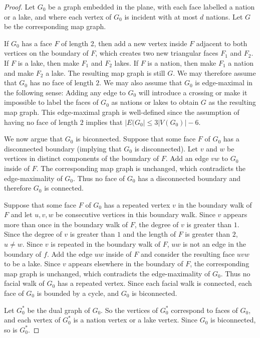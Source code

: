 \documentclass{patmorin}
\theoremstyle{plain}
\theoremstyle{definition}
\renewcommand{\leq}{\leqslant}
\begin{document}
\begin{proof}
Let $G_0$ be a graph embedded in the plane, with each face labelled a nation or a lake, and where each vertex of $G_0$ is incident with at most $d$ nations. Let $G$ be the corresponding map graph.

If $G_0$ has a face $F$ of length 2, then add a new vertex inside $F$ adjacent to both vertices on the boundary of $F$, which creates two new triangular faces $F_1$ and $F_2$. If $F$ is a lake, then make $F_1$ and $F_2$ lakes. If $F$ is a nation, then make $F_1$ a nation and make $F_2$ a lake. The resulting map graph is still $G$. We may therefore assume that $G_0$ has no face of length $2$.  We may also assume that $G_0$ is edge-maximal in the following sense: Adding any edge to $G_0$ will introduce a crossing or make it impossible to label the faces of $G_0$ as nations or lakes to obtain $G$ as the resulting map graph. This edge-maximal graph is well-defined since the assumption of having no face of length $2$ implies that $|E(G_0|\leq 3|V(G_0)|-6$.

We now argue that $G_0$ is biconnected.  Suppose that some face $F$ of $G_0$ has a disconnected boundary (implying that $G_0$ is disconnected). Let $v$ and $w$ be vertices in distinct components of the boundary of $F$. Add an edge $vw$ to $G_0$ inside of $F$. The corresponding map graph is unchanged, which contradicts the edge-maximality of $G_0$. Thus no face of $G_0$ has a disconnected boundary and therefore $G_0$ is connected.

Suppose that some face $F$ of $G_0$ has a repeated vertex $v$ in the boundary walk of $F$ and let $u,v,w$ be consecutive vertices in this boundary walk.  Since $v$ appears more than once in the boundary walk of $F$, the degree of $v$ is greater than $1$.  Since the degree of $v$ is greater than $1$ and the length of $F$ is greater than $2$, $u\neq w$. Since $v$ is repeated in the boundary walk of $F$, $uw$ is not an edge in the boundary of $f$. Add the edge $uw$ inside of $F$ and consider the resulting face $uvw$ to be a lake. Since $v$ appears elsewhere in the boundary of $F$, the corresponding map graph is unchanged, which contradicts the edge-maximality of $G_0$. Thus no facial walk of $G_0$ has a repeated vertex. Since each facial walk is connected, each face of $G_0$ is bounded by a cycle, and $G_0$ is biconnected.

Let $G_0^*$ be the dual graph of $G_0$. So the vertices of $G_0^*$ correspond to faces of $G_0$, and each vertex of $G_0^*$ is a nation vertex or a lake vertex. Since $G_0$ is biconnected, so is $G^*_0$.


\end{proof}
\end{document}

